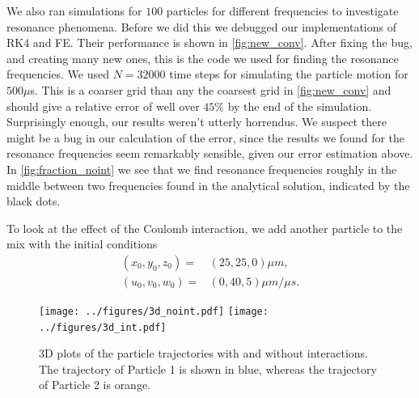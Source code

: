 We also ran simulations for $100$ particles for different frequencies to investigate resonance
phenomena. Before we did this we debugged our implementations of RK4 and FE. Their performance is
shown in \autoref{fig:new_conv}. After fixing the bug, and creating many new ones, this is the code we
used for finding the resonance frequencies. We used $N = 32000$ time steps for simulating the particle
motion for $500 \mu$s. This is a coarser grid than any the coarsest grid in \autoref{fig:new_conv}
and should give a relative error of well over $45\%$ by the end of the simulation.
Surprisingly enough, our results weren't utterly horrendus.
We suspect there might be a bug in our calculation of the
error, since the results we found for the resonance frequencies seem remarkably sensible, given our error estimation above.
In \autoref{fig:fraction_noint} we see that we find resonance frequencies roughly in the middle between
two frequencies found in the analytical solution, indicated by the black dots.

To look at the effect of the Coulomb interaction, we add another particle to the mix with the initial
conditions
\begin{align}
  (x_0, y_0, z_0) =& (25, 25, 0)\mu m, \\
  (u_0, v_0, w_0) =& (0, 40, 5) \mu m / \mu s.
\end{align}

\begin{figure}
\centering
\texttt{[image: ../figures/3d\_noint.pdf]}
\texttt{[image: ../figures/3d\_int.pdf]}
\caption{3D plots of the particle trajectories with and without interactions. The trajectory of Particle 1 is shown in blue, whereas the trajectory of Particle 2 is orange. }
\label{fig:3d}
\end{figure}

